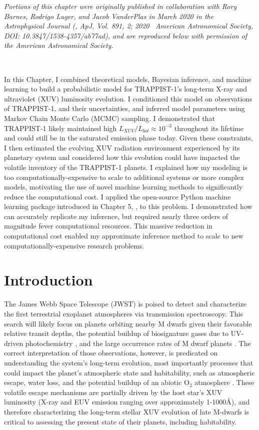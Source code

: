 \textit{Portions of this chapter were originally published in collaboration with Rory Barnes, Rodrigo Luger, and Jacob VanderPlas in March 2020 in the Astrophysical Journal (\citet{Fleming2020}, ApJ, Vol. 891, 2; 2020 \textcopyright \ American Astronomical Society, DOI: 10.3847/1538-4357/ab77ad), and are reproduced below with permission of the American Astronomical Society.}

\

In this Chapter, I combined theoretical models, Bayesian inference, and machine learning to build a probabilistic model for TRAPPIST-1's long-term X-ray and ultraviolet (XUV) luminosity evolution. I conditioned this model on observations of TRAPPIST-1, and their uncertainties, and inferred model parameters using Markov Chain Monte Carlo (MCMC) sampling. I demonstrated that TRAPPIST-1 likely maintained high $L_{XUV}/L_{bol} \approx 10^{-3}$ throughout its lifetime and could still be in the saturated emission phase today. Given these constraints, I then estimated the evolving XUV radiation environment experienced by its planetary system and considered how this evolution could have impacted the volatile inventory of the TRAPPIST-1 planets. I explained how my modeling is too computationally-expensive to scale to additional systems or more complex models, motivating the use of novel machine learning methods to significantly reduce the computational cost. I applied the open-source Python machine learning package introduced in Chapter 5, \approxposterior, to this problem. I demonstrated how \approxposterior can accurately replicate my inference, but required nearly three orders of magnitude fever computational resources. This massive reduction in computational cost enabled my approximate inference method to scale to new computationally-expensive research problems. 


\section{Introduction} \label{trap:sec:intro}

The James Webb Space Telescope (JWST) is poised to detect and characterize the first terrestrial exoplanet atmospheres via transmission spectroscopy. This search will likely focus on planets orbiting nearby M dwarfs given their favorable relative transit depths, the potential buildup of biosignature gases due to UV-driven photochemistry \citep{Segura2005}, and the large occurrence rates of M dwarf planets \citep{Dressing2015}. The correct interpretation of those observations, however, is predicated on understanding the system's long-term evolution, most importantly processes that could impact the planet's atmospheric state and habitability, such as atmospheric escape, water loss, and the potential buildup of an abiotic O$_2$ atmosphere \citep{Watson1981,Lammer2003,MurrayClay2009,Luger2015}. These volatile escape mechanisms are partially driven by the host star's XUV luminosity (X-ray and EUV emission ranging over approximately 1-1000\AA), and therefore characterizing the long-term stellar XUV evolution of late M-dwarfs is critical to assessing the present state of their planets, including habitability.

